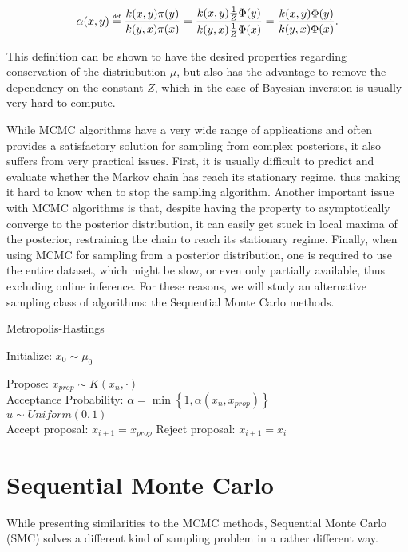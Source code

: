 \documentclass{article}
\newcommand\defeq{\mathrel{\overset{\makebox[0pt]{\mbox{\normalfont\tiny\sffamily def}}}{=}}}
\begin{document}
\begin{equation}
  \alpha(x, y)
  \defeq \frac{k(x, y) \pi(y)}{k(y, x) \pi(x)}
  = \frac{k(x, y) \frac{1}{Z}\Phi(y)}{k(y, x) \frac{1}{Z}\Phi(x)}
  = \frac{k(x, y) \Phi(y)}{k(y, x) \Phi(x)}.
\end{equation}

This definition can be shown to have the desired properties regarding conservation of the distriubution $\mu$, but also has the advantage to remove the dependency on the constant $Z$, which in the case of Bayesian inversion is usually very hard to compute.

While MCMC algorithms have a very wide range of applications and often provides a satisfactory solution for sampling from complex posteriors, it also suffers from very practical issues. First, it is usually difficult to predict and evaluate whether the Markov chain has reach its stationary regime, thus making it hard to know when to stop the sampling algorithm. Another important issue with MCMC algorithms is that, despite having the property to asymptotically converge to the posterior distribution, it can easily get stuck in local maxima of the posterior, restraining the chain to reach its stationary regime. Finally, when using MCMC for sampling from a posterior distribution, one is required to use the entire dataset, which might be slow, or even only partially available, thus excluding online inference. For these reasons, we will study an alternative sampling class of algorithms: the Sequential Monte Carlo methods. 

\begin{algorithm}
  \label{alg-metropolis-hastings}
  \caption{Metropolis-Hastings}
  Initialize: $x_0 \sim \mu_0$

   {
    Propose: $x_{prop} \sim K(x_n, \cdot)$\\
    Acceptance Probability:
    $\alpha = \min \left\{ 1, \alpha(x_n, x_{prop}) \right\}$\\
    $u \sim Uniform(0, 1)$\\
     {
      Accept proposal: $x_{i+1} = x_{prop}$
    } {
      Reject proposal: $x_{i+1} = x_i$
    }
  }
\end{algorithm}

\section{Sequential Monte Carlo}

While presenting similarities to the MCMC methods, Sequential Monte Carlo (SMC) solves a different kind of sampling problem in a rather different way.
\end{document}
